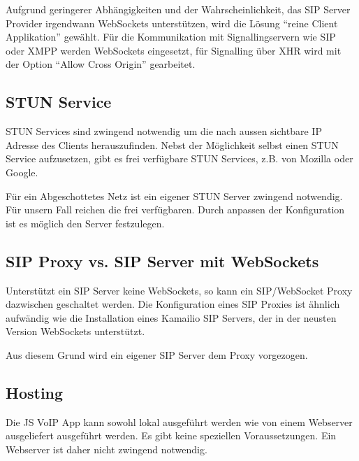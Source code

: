 		Aufgrund geringerer Abhängigkeiten und der Wahrscheinlichkeit, das SIP Server Provider irgendwann WebSockets unterstützen, wird die Lösung ``reine Client Applikation'' gewählt.
		Für die Kommunikation mit Signallingservern wie SIP oder XMPP werden WebSockets eingesetzt, für Signalling über XHR wird mit der Option ``Allow Cross Origin'' gearbeitet.

	\subsection{STUN Service}
		STUN Services sind zwingend notwendig um die nach aussen sichtbare IP Adresse des Clients herauszufinden. Nebst der Möglichkeit selbst einen STUN Service aufzusetzen, gibt es frei verfügbare STUN Services, z.B. von Mozilla oder Google.


		Für ein Abgeschottetes Netz ist ein eigener STUN Server zwingend notwendig. Für unsern Fall reichen die frei verfügbaren. Durch anpassen der Konfiguration ist es möglich den Server festzulegen.


	\subsection{SIP Proxy vs. SIP Server mit WebSockets}
		Unterstützt ein SIP Server keine WebSockets, so kann ein SIP/WebSocket Proxy dazwischen geschaltet werden. Die Konfiguration eines SIP Proxies ist ähnlich aufwändig wie die Installation eines Kamailio SIP Servers, der in der neusten Version WebSockets unterstützt.


		Aus diesem Grund wird ein eigener SIP Server dem Proxy vorgezogen.


	\subsection{Hosting}
		Die JS VoIP App kann sowohl lokal ausgeführt werden wie von einem Webserver ausgeliefert ausgeführt werden. Es gibt keine speziellen Voraussetzungen. Ein Webserver ist daher nicht zwingend notwendig.
	
